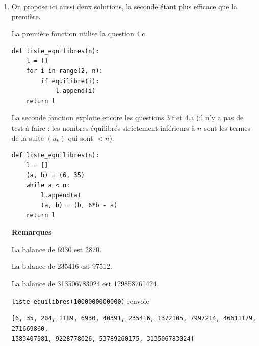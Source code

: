 \begin{enumerate}
\begin{enumerate}
    \begin{verbatim}
def equilibre(n):
    k = mystere(n)   # k vaut 1+2+...+(n-1)
    s = n+1
    i = n+2
    while s < k:
        s = s + i
        i = i + 1
    return s == k
    \end{verbatim}
    
    Dans $s$, on calcule $s = (n+1) + \ldots + i$ jusqu'à ce que cette somme dépasse le seuil $k$. On regarde alors si cette somme est exactement égale à $k$ ; si c'est le cas, $n$ est équilibré.
    
    Mais on peut aussi écrire la fonction suivante, de complexité bien meilleure, en exploitant les questions 3.f et 4.a : les nombres équilibrés sont exactement les termes de la suite $(u_k)$, qui vérifie $u_1 = 6$, $u_2 = 35$ et $u_{k+1} = 6u_k - u_{k-1}$.
    
    \begin{verbatim}
def equilibre(n):
    (a, b) = (6, 35)
    while a < n:
        (a, b) = (b, 6*b - a)
    return a == n
    \end{verbatim}
\end{enumerate}

\item \textbf{} On propose ici aussi deux solutions, la seconde étant plus efficace que la première.

La première fonction utilise la question 4.c.

\begin{verbatim}
def liste_equilibres(n):
    l = []
    for i in range(2, n):
        if equilibre(i):
            l.append(i)
    return l
\end{verbatim}

La seconde fonction exploite encore les questions 3.f et 4.a (il n'y a pas de test à faire : les nombres équilibrés strictement inférieurs à $n$ sont les termes de la suite $(u_k)$ qui sont $< n$).

\begin{verbatim}
def liste_equilibres(n):
    l = []
    (a, b) = (6, 35)
    while a < n:
        l.append(a)
        (a, b) = (b, 6*b - a)
    return l
\end{verbatim}

\textbf{Remarques}

La balance de 6930 est 2870.

La balance de 235416 est 97512.

La balance de 313506783024 est 129858761424.

\texttt{liste\_equilibres(1000000000000)} renvoie

\texttt{[6, 35, 204, 1189, 6930, 40391, 235416, 1372105, 7997214, 46611179, 271669860, \\1583407981, 9228778026, 53789260175, 313506783024]}




\end{enumerate}

